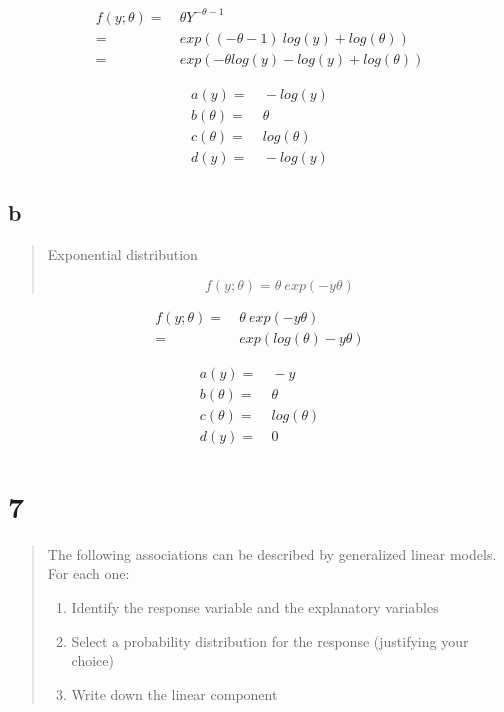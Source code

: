 \documentclass[11pt]{article}
\begin{document}
\begin{equation}
\begin{split}
f(y; \theta) = & \ \theta Y^{-\theta - 1}\\
= & \ exp((- \theta - 1) \ log(y) + log(\theta))\\
= & \ exp(- \theta log(y) - log(y) + log(\theta))
\end{split}
\end{equation}


\begin{equation}
\begin{split}
a(y) = & \ - log(y)\\
b(\theta) = & \ \theta\\
c(\theta) = & \ log(\theta)\\
d(y) = & \ - log(y)
\end{split}
\end{equation}

\subsection{b}
\label{sec:orgdf58f98}
\begin{quote}
Exponential distribution

$$
f(y; \theta) = \theta \ exp(-y \theta)
$$
\end{quote}

\begin{equation}
\begin{split}
f(y; \theta) = & \ \theta \ exp(-y \theta)\\
= & \ exp(log(\theta) - y \theta)
\end{split}
\end{equation}


\begin{equation}
\begin{split}
a(y) = & \ -y\\
b(\theta) = & \ \theta\\
c(\theta) = & \ log(\theta)\\
d(y) = & \ 0
\end{split}
\end{equation}

\section{7}
\label{sec:orgb8ce061}
\begin{quote}
The following associations can be described by generalized linear models. For
each one:
\begin{enumerate}
\item Identify the response variable and the explanatory variables
\item Select a probability distribution for the response (justifying your choice)
\item Write down the linear component
\end{enumerate}
\end{quote}
\end{document}
